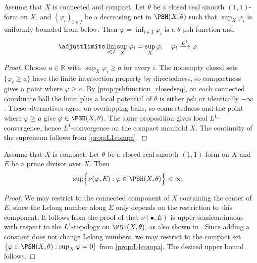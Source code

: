 \begin{corollary}\label{cor:decreasingnetL1conv}
    Assume that $X$ is connected and compact. Let $\theta$ be a closed real smooth $(1,1)$-form on $X$, and $(\varphi_i)_{i\in I}$ be a decreasing net in $\PSH(X,\theta)$ such that $\sup_X \varphi_i$ is uniformly bounded from below. Then $\varphi=\inf_{i\in I} \varphi_i$ is a $\theta$-psh function and
    \begin{equation}\label{eq:decreasingnetL1conv}
    \adjustlimits\lim_{i\in I}\sup_X \varphi_i=\sup_X \varphi,\quad \varphi_i\xrightarrow{L^1}\varphi.
    \end{equation}
\end{corollary}
\begin{proof}
    Choose $a\in\mathbb R$ with $\sup_X\varphi_i\geq a$ for every $i$. The nonempty closed sets $\{\varphi_i\geq a\}$ have the finite intersection property by directedness, so compactness gives a point where $\varphi\geq a$. By \cref{prop:pshfunction_closedseq}, on each connected coordinate ball the limit plus a local potential of $\theta$ is either psh or identically $-\infty$. These alternatives agree on overlapping balls, so connectedness and the point where $\varphi\geq a$ give $\varphi\in\PSH(X,\theta)$. The same proposition gives local $L^1$-convergence, hence $L^1$-convergence on the compact manifold $X$. The continuity of the supremum follows from \cref{prop:L1compa}.
\end{proof}


\begin{proposition}\label{prop:Lelongnumberupperbound}
Assume that $X$ is compact.
    Let $\theta$ be a closed real smooth $(1,1)$-form on $X$ and $E$ be a prime divisor over $X$.
    Then
    \[
        \sup \Bigl\{ \nu(\varphi,E): \varphi\in \PSH(X,\theta) \Bigr\}<\infty.
    \]
\end{proposition}
\begin{proof}
    We may restrict to the connected component of $X$ containing the center of $E$, since the Lelong number along $E$ only depends on the restriction to this component.
    It follows from the proof of \cite[Exercise~2.7]{GZ17} that $\nu(\bullet,E)$ is upper semicontinuous with respect to the $L^1$-topology on $\PSH(X,\theta)$, as also shown in \cite[Proposition~14.2.8]{FPT}. Since adding a constant does not change Lelong numbers, we may restrict to the compact set $\{\varphi\in \PSH(X,\theta):\sup_X\varphi=0\}$ from \cref{prop:L1compa}. The desired upper bound follows.
\end{proof}

